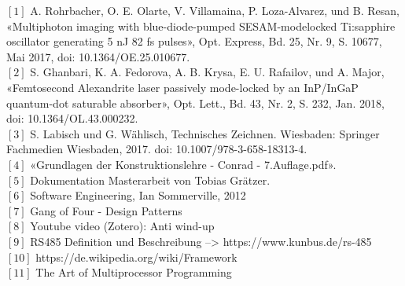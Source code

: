 $[1]$	A. Rohrbacher, O. E. Olarte, V. Villamaina, P. Loza-Alvarez, und B. Resan, «Multiphoton imaging with blue-diode-pumped SESAM-modelocked Ti:sapphire oscillator generating 5 nJ 82 fs pulses», Opt. Express, Bd. 25, Nr. 9, S. 10677, Mai 2017, doi: 10.1364/OE.25.010677.\\

$[2]$	S. Ghanbari, K. A. Fedorova, A. B. Krysa, E. U. Rafailov, und A. Major, «Femtosecond Alexandrite laser passively mode-locked by an InP/InGaP quantum-dot saturable absorber», Opt. Lett., Bd. 43, Nr. 2, S. 232, Jan. 2018, doi: 10.1364/OL.43.000232.\\

$[3]$    S. Labisch und G. Wählisch, Technisches Zeichnen. Wiesbaden: Springer Fachmedien Wiesbaden, 2017. doi: 10.1007/978-3-658-18313-4.\\

$[4]$   «Grundlagen der Konstruktionslehre - Conrad - 7.Auflage.pdf».\\

$[5]$    Dokumentation Masterarbeit von Tobias Grätzer.\\

$[6]$   Software Engineering, Ian Sommerville, 2012\\

$[7]$   Gang of Four - Design Patterns\\

$[8]$   Youtube video (Zotero): Anti wind-up\\

$[9]$   RS485 Definition und Beschreibung --> https://www.kunbus.de/rs-485\\

$[10]$  https://de.wikipedia.org/wiki/Framework\\

$[11]$  The Art of Multiprocessor Programming